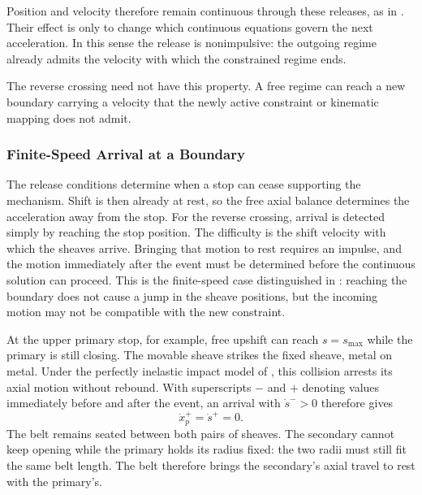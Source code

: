 \documentclass[11pt]{report}
\numberwithin{equation}{section}
\newcounter{assump}
\begin{document}
Position and velocity therefore remain continuous through these releases, as in
. Their effect is only to change which
continuous equations govern the next acceleration. In this sense the release is
nonimpulsive: the outgoing regime already admits the velocity with which the constrained
regime ends.

The reverse crossing need not have this property. A free regime can reach a new boundary
carrying a velocity that the newly active constraint or kinematic mapping does not
admit.

\subsubsection{Finite-Speed Arrival at a Boundary}
\label{sec:finite_speed_shift_boundary_arrival}

The release conditions determine when a stop can cease supporting the
mechanism. Shift is then already at rest, so the free axial balance
determines the acceleration away from the stop. For the reverse crossing,
arrival is detected simply by reaching the stop position. The difficulty
is the shift velocity with which the sheaves arrive. Bringing that motion
to rest requires an impulse, and the motion immediately after the event
must be determined before the continuous solution can proceed. This is the
finite-speed case distinguished in
: reaching the boundary does not
cause a jump in the sheave positions, but the incoming motion may not be
compatible with the new constraint.

At the upper primary stop, for example, free upshift can reach
\(s=s_{\max}\) while the primary is still closing. The movable sheave
strikes the fixed sheave, metal on metal. Under the perfectly inelastic
impact model of , this
collision arrests its axial motion without rebound. With superscripts
\(-\) and \(+\) denoting values immediately before and after the event,
an arrival with \(\dot s^->0\) therefore gives
\begin{equation}
    \dot x_p^+=\dot s^+=0.
    \label{eq:upper_stop_post_event_velocity}
\end{equation}
The belt remains seated between both pairs of sheaves. The secondary
cannot keep opening while the primary holds its radius fixed: the two
radii must still fit the same belt length. The belt therefore brings the
secondary's axial travel to rest with the primary's.
\end{document}
